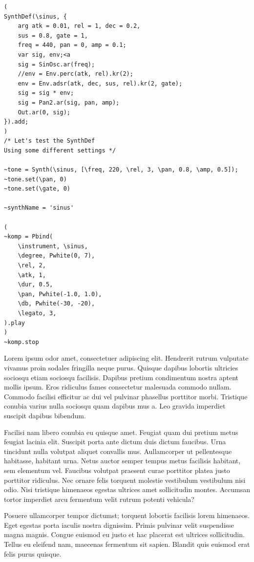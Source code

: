 \begin{listing}
\begin{verbatim}
(
SynthDef(\sinus, {
	arg atk = 0.01, rel = 1, dec = 0.2,
	sus = 0.8, gate = 1,
	freq = 440, pan = 0, amp = 0.1;
	var sig, env;<a
	sig = SinOsc.ar(freq);
	//env = Env.perc(atk, rel).kr(2);
	env = Env.adsr(atk, dec, sus, rel).kr(2, gate);
	sig = sig * env;
	sig = Pan2.ar(sig, pan, amp);
	Out.ar(0, sig);
}).add;
)
/* Let's test the SynthDef
Using some different settings */

~tone = Synth(\sinus, [\freq, 220, \rel, 3, \pan, 0.8, \amp, 0.5]);
~tone.set(\pan, 0)
~tone.set(\gate, 0)

~synthName = 'sinus'

(
~komp = Pbind(
	\instrument, \sinus,
	\degree, Pwhite(0, 7),
	\rel, 2,
	\atk, 1,
	\dur, 0.5,
	\pan, Pwhite(-1.0, 1.0),
	\db, Pwhite(-30, -20),
	\legato, 3,
).play
)
~komp.stop
\end{verbatim}
\caption{Some more awesome code, using the custom lexer}
\end{listing}


Lorem ipsum odor amet, consectetuer adipiscing elit. Hendrerit rutrum vulputate vivamus proin sodales fringilla neque purus. Quisque dapibus lobortis ultricies sociosqu etiam sociosqu facilisis. Dapibus pretium condimentum nostra aptent mollis ipsum. Eros ridiculus fames consectetur malesuada commodo nullam. Commodo facilisi efficitur ac dui vel pulvinar phasellus porttitor morbi. Tristique conubia varius nulla sociosqu quam dapibus mus a. Leo gravida imperdiet suscipit dapibus bibendum.

Facilisi nam libero conubia eu quisque amet. Feugiat quam dui pretium metus feugiat lacinia elit. Suscipit porta ante dictum duis dictum faucibus. Urna tincidunt nulla volutpat aliquet convallis mus. Aullamcorper ut pellentesque habitasse, habitant urna. Netus auctor semper tempus metus facilisis habitant, sem elementum vel. Faucibus volutpat praesent curae porttitor platea justo porttitor ridiculus. Nec ornare felis torquent molestie vestibulum vestibulum nisi odio. Nisi tristique himenaeos egestas ultrices amet sollicitudin montes. Accumsan tortor imperdiet arcu fermentum velit rutrum potenti vehicula?

Posuere ullamcorper tempor dictumst; torquent lobortis facilisis lorem himenaeos. Eget egestas porta iaculis nostra dignissim. Primis pulvinar velit suspendisse magna magnis. Congue euismod eu justo et hac placerat est ultrices sollicitudin. Tellus eu eleifend nam, maecenas fermentum sit sapien. Blandit quis euismod erat felis purus quisque.